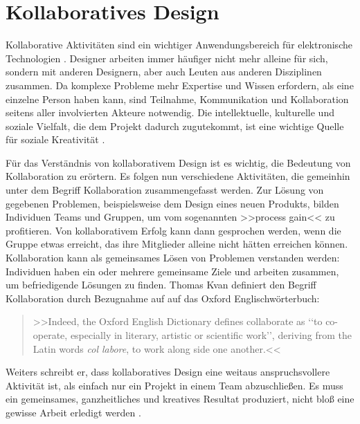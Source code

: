 \chapter{Kollaboratives Design}\label{ch:kollaborativesDesign}

Kollaborative Aktivitäten sind ein wichtiger Anwendungsbereich für elektronische Technologien \citep{Kvan:2000}. Designer arbeiten immer häufiger nicht mehr alleine für sich, sondern mit anderen Designern, aber auch Leuten aus anderen Disziplinen zusammen. Da komplexe Probleme mehr Expertise und Wissen erfordern, als eine einzelne Person haben kann, sind Teilnahme, Kommunikation und Kollaboration seitens aller involvierten Akteure notwendig. Die intellektuelle, kulturelle und soziale Vielfalt, die dem Projekt dadurch zugutekommt, ist eine wichtige Quelle für soziale Kreativität \citep{Fischer:2005}. 

\medskip Für das Verständnis von kollaborativem Design ist es wichtig, die Bedeutung von Kollaboration zu erörtern. Es folgen nun verschiedene Aktivitäten, die gemeinhin unter dem Begriff Kollaboration zusammengefasst werden. Zur Lösung von gegebenen Problemen, beispielsweise dem Design eines neuen Produkts, bilden Individuen Teams und Gruppen, um vom sogenannten >>process gain<< \citep{steiner:1972} zu profitieren. Von kollaborativem Erfolg kann dann gesprochen werden, wenn die Gruppe etwas erreicht, das ihre  Mitglieder alleine nicht hätten erreichen können. Kollaboration kann als gemeinsames Lösen von Problemen verstanden werden: Individuen haben ein oder mehrere gemeinsame Ziele und arbeiten zusammen, um befriedigende Lösungen zu finden. Thomas Kvan definiert den Begriff Kollaboration durch Bezugnahme auf auf das Oxford Englischwörterbuch:

\begin{quote} 
	>>Indeed, the Oxford English Dictionary defines collaborate as ‘‘to co-operate, especially in literary, artistic or scientific work’’, deriving from the Latin words \emph{col labore}, to work along side one another.<< \citep{Kvan:2000} 
\end{quote} 

Weiters schreibt er, dass kollaboratives Design eine weitaus anspruchsvollere Aktivität ist, als einfach nur ein Projekt in einem Team abzuschließen. Es muss ein gemeinsames, ganzheitliches und kreatives Resultat produziert, nicht bloß eine gewisse Arbeit erledigt werden \citep{Kvan:2000}.

